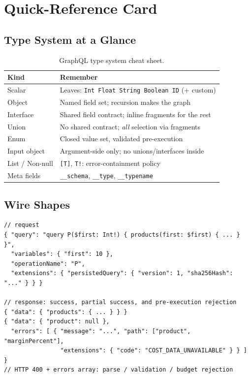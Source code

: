 \section{Quick-Reference Card}
\label{sec:ch12-quickref}

\subsection{Type System at a Glance}

\begin{table}[h]
  \centering
  \small
  \begin{tabularx}{\textwidth}{l X}
    \toprule
    \textbf{Kind} & \textbf{Remember} \\
    \midrule
    Scalar & Leaves: \texttt{Int Float String Boolean ID} (+ custom) \\
    Object & Named field set; recursion makes the graph \\
    Interface & Shared field contract; inline fragments for the rest \\
    Union & No shared contract; \emph{all} selection via fragments \\
    Enum & Closed value set, validated pre-execution \\
    Input object & Argument-side only; no unions/interfaces inside \\
    List / Non-null & \texttt{[T]}, \texttt{T!}: error-containment policy \\
    Meta fields & \texttt{\_\_schema}, \texttt{\_\_type}, \texttt{\_\_typename} \\
    \bottomrule
  \end{tabularx}
  \caption{GraphQL type system cheat sheet.}
  \label{tab:ch12-typecard}
\end{table}

\subsection{Wire Shapes}

\begin{verbatim}
// request
{ "query": "query P($first: Int!) { products(first: $first) { ... } }",
  "variables": { "first": 10 },
  "operationName": "P",
  "extensions": { "persistedQuery": { "version": 1, "sha256Hash": "..." } } }

// response: success, partial success, and pre-execution rejection
{ "data": { "products": { ... } } }
{ "data": { "product": null },
  "errors": [ { "message": "...", "path": ["product", "marginPercent"],
                "extensions": { "code": "COST_DATA_UNAVAILABLE" } } ] }
// HTTP 400 + errors array: parse / validation / budget rejection
\end{verbatim}

